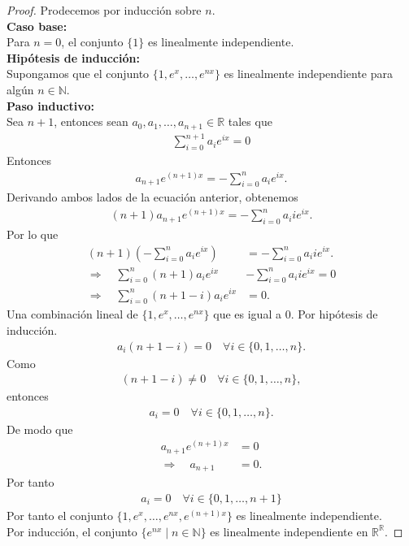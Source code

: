 \documentclass[11pt,letterpaper]{article}
\newcommand{\R}{\mathbb{R}}
\newcommand{\N}{\mathbb{N}}
\begin{document}
\begin{proof}
    Prodecemos por inducción sobre $n$.\\ 
    \textbf{Caso base:}\\ [10pt] Para $n = 0$, el conjunto $\{1\}$ es linealmente independiente.\\ [10pt]
    \textbf{Hipótesis de inducción:}\\ [10pt] Supongamos que el conjunto $\{1, e^x, \dots, e^{nx}\}$ es linealmente independiente para algún $n \in \N$.\\ [10pt]
    \textbf{Paso inductivo:}\\ [10pt] Sea $n + 1$, entonces sean $a_0, a_1, \dots, a_{n+1} \in \R$ tales que
    \begin{align*}
        \sum_{i=0}^{n+1} a_ie^{ix} = 0
    \end{align*}
    Entonces
    \begin{align*}
        a_{n+1} e^{(n+1)x} =-\sum_{i=0}^{n} a_ie^{ix}.
    \end{align*}
    Derivando ambos lados de la ecuación anterior, obtenemos
    \begin{align*}
        (n+1)a_{n+1}e^{(n+1)x}=-\sum_{i=0}^{n} a_i i e^{ix}.
    \end{align*}
    Por lo que
    \begin{align*}
        (n+1)(-\sum_{i=0}^{n} a_ie^{ix})&=-\sum_{i=0}^{n} a_i i e^{ix}.\\
        \Rightarrow \quad \sum_{i=0}^{n} (n+1)a_ie^{ix}&-\sum_{i=0}^{n} a_i i e^{ix}=0\\
        \Rightarrow \quad \sum_{i=0}^{n}(n+1-i)a_ie^{ix}&=0.
    \end{align*}
    Una combinación lineal de $\{1, e^x, \dots, e^{nx}\}$ que es igual a $0$. Por hipótesis de inducción.
    \begin{align*}
        a_i(n+1-i)=0 \quad \forall i \in \{0,1,\dots,n\}.
    \end{align*}
    Como
    \begin{align*}
        (n+1-i)\neq0 \quad \forall i \in \{0,1,\dots,n\},
    \end{align*}
    entonces
    \begin{align*}
        a_i=0 \quad \forall i \in \{0,1,\dots,n\}.
    \end{align*}
    De modo que
    \begin{align*}
        a_{n+1} e^{(n+1)x} &= 0 \\
        \Rightarrow \quad a_{n+1} &= 0.
    \end{align*}
    Por tanto
    \begin{align*}
        a_i=0 \quad \forall i \in \{0,1,\dots,n+1\}
    \end{align*}
    Por tanto el conjunto $\{1, e^x, \dots, e^{nx}, e^{(n+1)x}\}$ es linealmente independiente.\\
    Por inducción, el conjunto $\{e^{nx} \mid n \in \N\}$ es linealmente independiente en $\R^{\R}$.
\end{proof}
\end{document}
